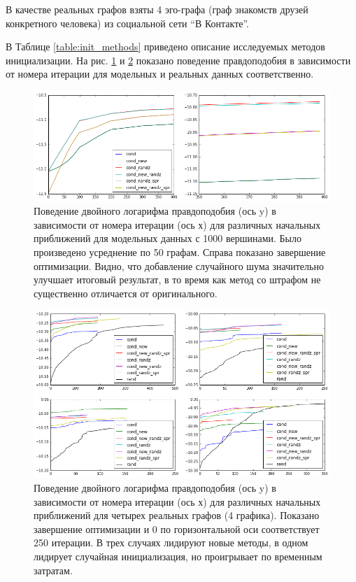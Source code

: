 \documentclass{ITaSconf}
\begin{document}
	В качестве реальных графов взяты 4 эго-графа (граф знакомств друзей конкретного человека) из социальной сети ``В Контакте''.
	
	В Таблице \ref{table:init_methods} приведено описание исследуемых методов инициализации.
	На рис. \ref{fig:llh_init_model} и \ref{fig:llh_init_real} показано поведение правдоподобия в зависимости от номера итерации для модельных и реальных данных соответственно.
	
	\begin{figure}[!h]
		\centering
		\includegraphics[width=\linewidth]{imgs/init_new_good.png}
		\caption{Поведение двойного логарифма правдоподобия (ось y) в зависимости от номера итерации (ось х) для различных начальных приближений для модельных данных \cite{lancichinetti2009benchmarks} с 1000 вершинами. Было произведено усреднение по 50 графам. Справа показано завершение оптимизации. Видно, что добавление случайного шума значительно улучшает итоговый результат, в то время как метод со штрафом не существенно отличается от оригинального.}
		\label{fig:llh_init_model}
	\end{figure}
	\begin{figure}[!h]
		\centering
		\includegraphics[width=\linewidth]{imgs/init_llh_real.png}
		\caption{Поведение двойного логарифма правдоподобия (ось y) в зависимости от номера итерации (ось х) для различных начальных приближений для четырех реальных графов (4 графика). Показано завершение оптимизации и 0 по горизонтальной оси соответствует 250 итерации. В трех случаях лидируют новые методы, в одном лидирует случайная инициализация, но проигрывает по временным затратам. }
		\label{fig:llh_init_real}
	\end{figure}
\end{document}

